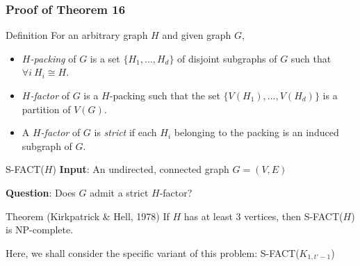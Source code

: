 \documentclass{beamer}
\begin{document}


\begin{frame}
\frametitle{Proof of Theorem 16}

\begin{block}{Definition}
For an arbitrary graph $H$ and given graph $G$,

\begin{itemize}
	\item {\it $H$-packing} of $G$ is a set $\{H_1, \dots, H_d\}$ of disjoint subgraphs of $G$ such that $\forall i \ H_i \cong H$.
	
	\item {\it $H$-factor} of $G$ is a $H$-packing such that the set $\{V(H_1), \dots, V(H_d)\}$ is a partition of $V(G)$.
	
	\item A {\it $H$-factor} of $G$ is {\it strict} if each $H_i$ belonging to the packing is an induced subgraph of $G$.
\end{itemize}

\end{block} \pause

\begin{block}{\textsc{S-FACT}($H$)}
{\bf Input}: An undirected, connected graph $G = (V, E)$

{\bf Question}: Does $G$ admit a strict $H$-factor?

\end{block} \pause

\begin{block}{Theorem (Kirkpatrick \& Hell, 1978)}
If $H$ has at least 3 vertices, then \textsc{S-FACT}($H$) is NP-complete.

\end{block}

Here, we shall consider the specific variant of this problem: \textsc{S-FACT}($K_{1, t' - 1}$)

\end{frame}

\end{document}
